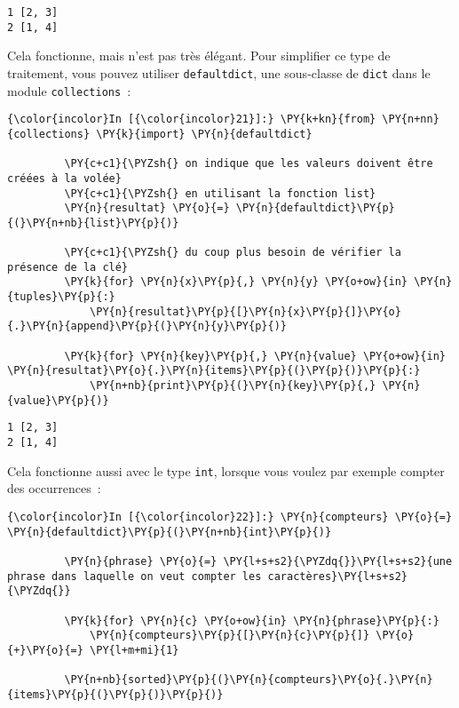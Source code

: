     \begin{Verbatim}[commandchars=\\\{\}]
1 [2, 3]
2 [1, 4]

    \end{Verbatim}

    Cela fonctionne, mais n'est pas très élégant. Pour simplifier ce type de
traitement, vous pouvez utiliser \texttt{defaultdict}, une sous-classe
de \texttt{dict} dans le module \texttt{collections}~:

    \begin{Verbatim}[commandchars=\\\{\}]
{\color{incolor}In [{\color{incolor}21}]:} \PY{k+kn}{from} \PY{n+nn}{collections} \PY{k}{import} \PY{n}{defaultdict}
         
         \PY{c+c1}{\PYZsh{} on indique que les valeurs doivent être créées à la volée}
         \PY{c+c1}{\PYZsh{} en utilisant la fonction list}
         \PY{n}{resultat} \PY{o}{=} \PY{n}{defaultdict}\PY{p}{(}\PY{n+nb}{list}\PY{p}{)}
         
         \PY{c+c1}{\PYZsh{} du coup plus besoin de vérifier la présence de la clé}
         \PY{k}{for} \PY{n}{x}\PY{p}{,} \PY{n}{y} \PY{o+ow}{in} \PY{n}{tuples}\PY{p}{:}
             \PY{n}{resultat}\PY{p}{[}\PY{n}{x}\PY{p}{]}\PY{o}{.}\PY{n}{append}\PY{p}{(}\PY{n}{y}\PY{p}{)}
         
         \PY{k}{for} \PY{n}{key}\PY{p}{,} \PY{n}{value} \PY{o+ow}{in} \PY{n}{resultat}\PY{o}{.}\PY{n}{items}\PY{p}{(}\PY{p}{)}\PY{p}{:}
             \PY{n+nb}{print}\PY{p}{(}\PY{n}{key}\PY{p}{,} \PY{n}{value}\PY{p}{)}
\end{Verbatim}


    \begin{Verbatim}[commandchars=\\\{\}]
1 [2, 3]
2 [1, 4]

    \end{Verbatim}

    Cela fonctionne aussi avec le type \texttt{int}, lorsque vous voulez par
exemple compter des occurrences~:

    \begin{Verbatim}[commandchars=\\\{\}]
{\color{incolor}In [{\color{incolor}22}]:} \PY{n}{compteurs} \PY{o}{=} \PY{n}{defaultdict}\PY{p}{(}\PY{n+nb}{int}\PY{p}{)}
         
         \PY{n}{phrase} \PY{o}{=} \PY{l+s+s2}{\PYZdq{}}\PY{l+s+s2}{une phrase dans laquelle on veut compter les caractères}\PY{l+s+s2}{\PYZdq{}}
         
         \PY{k}{for} \PY{n}{c} \PY{o+ow}{in} \PY{n}{phrase}\PY{p}{:}
             \PY{n}{compteurs}\PY{p}{[}\PY{n}{c}\PY{p}{]} \PY{o}{+}\PY{o}{=} \PY{l+m+mi}{1}
         
         \PY{n+nb}{sorted}\PY{p}{(}\PY{n}{compteurs}\PY{o}{.}\PY{n}{items}\PY{p}{(}\PY{p}{)}\PY{p}{)}
\end{Verbatim}


